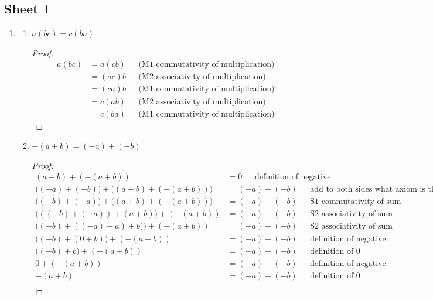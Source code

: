 \subsection{Sheet 1}

\begin{enumerate}

\item
  \begin{enumerate}[label=(\alph*)]
  \item \begin{theorem*} $a(bc) = c(ba)$\end{theorem*}
    \begin{proof}
      \begin{align*}
        a(bc) &= a(cb)  ~~~~~~~ \text{(M1 commutativity of multiplication)}\\
              &= (ac)b  ~~~~~~~ \text{(M2 associativity of multiplication)}\\
              &= (ca)b  ~~~~~~~ \text{(M1 commutativity of multiplication)}\\
              &= c(ab)  ~~~~~~~ \text{(M2 associativity of multiplication)}\\
              &= c(ba)  ~~~~~~~ \text{(M1 commutativity of multiplication)}
      \end{align*}
    \end{proof}
  \item
    \begin{theorem*}
      $-(a + b) = (-a) + (-b)$
    \end{theorem*}
    \begin{proof}
      \begin{align*}
        (a + b) + (-(a + b))                   &= 0           ~~~~~~~ \text{definition of negative}\\
        \Big((-a) + (-b)\Big) + \Big((a + b) + (-(a + b))\Big) &= (-a) + (-b) ~~~~~~~ \text{add to both sides what axiom is this?}\\
        \Big((-b) + (-a)\Big) + \Big((a + b) + (-(a + b))\Big)   &= (-a) + (-b) ~~~~~~~ \text{S1 commutativity of sum}\\
        \Big(((-b) + (-a)) + (a + b)\Big) + (-(a + b))   &= (-a) + (-b) ~~~~~~~ \text{S2 associativity of sum}\\
        \Big((-b) + ((-a) + a) + b)\Big) + (-(a + b))    &= (-a) + (-b) ~~~~~~~ \text{S2 associativity of sum}\\
        \Big((-b) + (0 + b)\Big) + (-(a + b))            &= (-a) + (-b) ~~~~~~~ \text{definition of negative}\\
        \Big((-b) + b\Big) + (-(a + b))                &= (-a) + (-b) ~~~~~~~ \text{definition of 0}\\
        0 + (-(a + b))                         &= (-a) + (-b) ~~~~~~~ \text{definition of negative}\\
        -(a + b)                               &= (-a) + (-b) ~~~~~~~ \text{definition of 0}\\
      \end{align*}
    \end{proof}
  \end{enumerate}


\end{enumerate}
